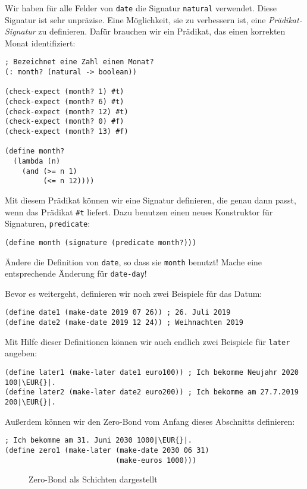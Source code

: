 \begin{aufgabe}
  Wir haben für alle Felder von \lstinline{date} die Signatur
  \lstinline{natural} verwendet. Diese Signatur ist sehr unpräzise.
  Eine Möglichkeit, sie zu verbessern ist, eine
  \textit{Prädikat-Signatur} zu definieren.
  Dafür brauchen wir ein Prädikat, das einen korrekten Monat
  identifiziert:
\begin{lstlisting}
; Bezeichnet eine Zahl einen Monat?
(: month? (natural -> boolean))

(check-expect (month? 1) #t)
(check-expect (month? 6) #t)
(check-expect (month? 12) #t)
(check-expect (month? 0) #f)
(check-expect (month? 13) #f)

(define month?
  (lambda (n)
    (and (>= n 1)
         (<= n 12))))  
\end{lstlisting}
  Mit diesem Prädikat können wir eine Signatur definieren, die genau
  dann passt, wenn das Prädikat \lstinline{#t} liefert.  Dazu benutzen
  einen neues Konstruktor für Signaturen, \lstinline{predicate}:
\begin{lstlisting}
(define month (signature (predicate month?)))
\end{lstlisting}
%
  Ändere die Definition von \lstinline{date}, so dass sie
  \lstinline{month} benutzt!  Mache eine entsprechende Änderung für
  \lstinline{date-day}!
\end{aufgabe}
%
Bevor es weitergeht, definieren wir noch zwei Beispiele für das Datum:
%
\begin{lstlisting}
(define date1 (make-date 2019 07 26)) ; 26. Juli 2019
(define date2 (make-date 2019 12 24)) ; Weihnachten 2019
\end{lstlisting}
%
Mit Hilfe dieser Definitionen können wir auch endlich zwei Beispiele
für \lstinline{later} angeben:
%
\begin{lstlisting}
(define later1 (make-later date1 euro100)) ; Ich bekomme Neujahr 2020 100|\EUR{}|.
(define later2 (make-later date2 euro200)) ; Ich bekomme am 27.7.2019 200|\EUR{}|.
\end{lstlisting}
%
Außerdem können wir den Zero-Bond vom Anfang dieses Abschnitts
definieren:
%
\begin{lstlisting}
; Ich bekomme am 31. Juni 2030 1000|\EUR{}|.
(define zero1 (make-later (make-date 2030 06 31)
                          (make-euros 1000)))
\end{lstlisting}

\begin{figure}[tb]
  \centering
{}
  
  \caption{Zero-Bond als Schichten dargestellt}
  \label{fig:zero-bond}
\end{figure}

